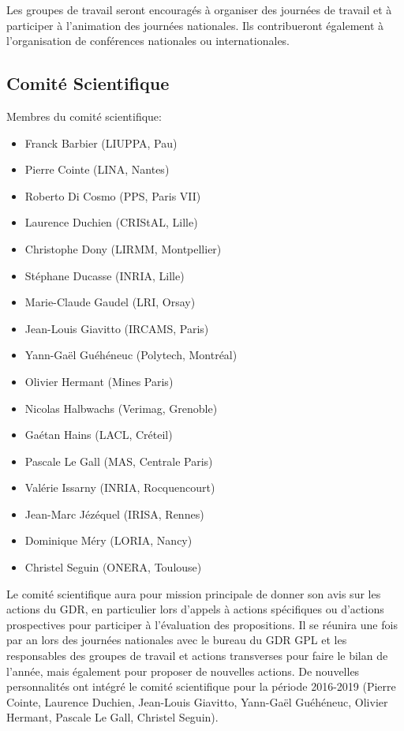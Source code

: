 \documentclass[11pt]{article}
\begin{document}
Les groupes de  travail seront encouragés à organiser des journées de travail et à participer à l'animation des journées nationales. Ils contribueront également à l'organisation de conférences nationales ou internationales.


\subsection{Comité  Scientifique}
Membres du comité scientifique:

\begin{itemize}
    \item Franck Barbier (LIUPPA, Pau)
    \item Pierre Cointe (LINA, Nantes)
    \item Roberto Di Cosmo (PPS, Paris VII)
    \item Laurence Duchien (CRIStAL, Lille)
    \item Christophe Dony (LIRMM, Montpellier)
    \item Stéphane Ducasse (INRIA, Lille)
    \item Marie-Claude Gaudel (LRI, Orsay)
    \item Jean-Louis Giavitto (IRCAMS, Paris)
    \item Yann-Gaël Guéhéneuc (Polytech, Montréal)
    \item Olivier Hermant (Mines Paris)
    \item Nicolas Halbwachs (Verimag, Grenoble)
    \item Gaétan Hains (LACL, Créteil)
    \item Pascale Le Gall (MAS, Centrale Paris)
    \item Valérie Issarny (INRIA, Rocquencourt)
    \item Jean-Marc Jézéquel (IRISA, Rennes)
    \item Dominique Méry (LORIA, Nancy)
    \item Christel Seguin (ONERA, Toulouse)
 \end{itemize}   

 \medskip

 \noindent
Le comité scientifique aura pour mission principale de donner son avis sur les
actions du GDR, en particulier lors d'appels à actions spécifiques ou d'actions
prospectives pour participer à l'évaluation des propositions.
Il se réunira une fois par an lors des journées nationales avec le bureau du
GDR GPL et les responsables des groupes de travail et actions transverses pour
faire le bilan de l'année, mais également pour proposer de nouvelles actions.
De nouvelles personnalités ont intégré le comité scientifique pour la période
2016-2019 (Pierre Cointe, Laurence Duchien, Jean-Louis Giavitto, Yann-Gaël
Guéhéneuc, Olivier Hermant, Pascale Le Gall, Christel Seguin).
\end{document}
